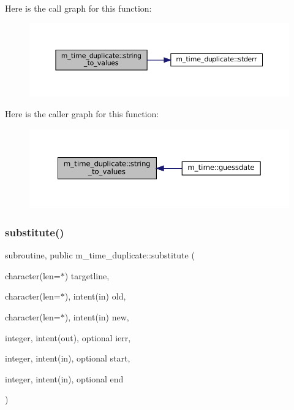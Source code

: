 Here is the call graph for this function\+:\nopagebreak
\begin{figure}[H]
\begin{center}
\leavevmode
\includegraphics[width=350pt]{namespacem__time__duplicate_a1bfa9e4483f2452c89c0388971bb21bd_cgraph}
\end{center}
\end{figure}
Here is the caller graph for this function\+:\nopagebreak
\begin{figure}[H]
\begin{center}
\leavevmode
\includegraphics[width=350pt]{namespacem__time__duplicate_a1bfa9e4483f2452c89c0388971bb21bd_icgraph}
\end{center}
\end{figure}
\mbox{\label{namespacem__time__duplicate_abc203f3a6afc1edeecbcdc58b187a5d5}} 
\subsubsection{\texorpdfstring{substitute()}{substitute()}}
{\footnotesize\ttfamily subroutine, public m\+\_\+time\+\_\+duplicate\+::substitute (\begin{DoxyParamCaption}\item[{character(len=$\ast$)}]{targetline,  }\item[{character(len=$\ast$), intent(in)}]{old,  }\item[{character(len=$\ast$), intent(in)}]{new,  }\item[{integer, intent(out), optional}]{ierr,  }\item[{integer, intent(in), optional}]{start,  }\item[{integer, intent(in), optional}]{end }\end{DoxyParamCaption})}



